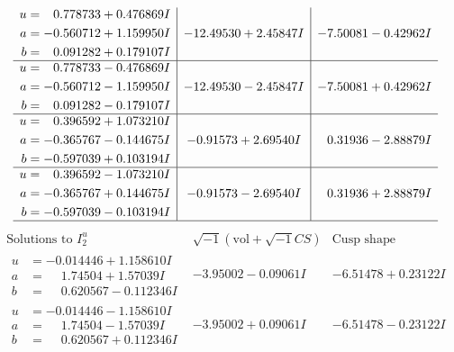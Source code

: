 \documentclass[1p]{elsarticle_modified}
\theoremstyle{definition}
\newcommand{\I}{\sqrt{-1}}
\begin{document}
$$\begin{array}{c|c|c}
\begin{aligned}
u &= \phantom{-}0.778733 + 0.476869 I \\
a &= -0.560712 + 1.159950 I \\
b &= \phantom{-}0.091282 + 0.179107 I\end{aligned}
 & -12.49530 + 2.45847 I & -7.50081 - 0.42962 I \\ \hline\begin{aligned}
u &= \phantom{-}0.778733 - 0.476869 I \\
a &= -0.560712 - 1.159950 I \\
b &= \phantom{-}0.091282 - 0.179107 I\end{aligned}
 & -12.49530 - 2.45847 I & -7.50081 + 0.42962 I \\ \hline\begin{aligned}
u &= \phantom{-}0.396592 + 1.073210 I \\
a &= -0.365767 - 0.144675 I \\
b &= -0.597039 + 0.103194 I\end{aligned}
 & -0.91573 + 2.69540 I & \phantom{-}0.31936 - 2.88879 I \\ \hline\begin{aligned}
u &= \phantom{-}0.396592 - 1.073210 I \\
a &= -0.365767 + 0.144675 I \\
b &= -0.597039 - 0.103194 I\end{aligned}
 & -0.91573 - 2.69540 I & \phantom{-}0.31936 + 2.88879 I\\
 \hline 
 \end{array}$$\newpage$$\begin{array}{c|c|c}  
\text{Solutions to }I^u_{2}& \I (\text{vol} + \sqrt{-1}CS) & \text{Cusp shape}\\
 \hline 
\begin{aligned}
u &= -0.014446 + 1.158610 I \\
a &= \phantom{-}1.74504 + 1.57039 I \\
b &= \phantom{-}0.620567 - 0.112346 I\end{aligned}
 & -3.95002 - 0.09061 I & -6.51478 + 0.23122 I \\ \hline\begin{aligned}
u &= -0.014446 - 1.158610 I \\
a &= \phantom{-}1.74504 - 1.57039 I \\
b &= \phantom{-}0.620567 + 0.112346 I\end{aligned}
 & -3.95002 + 0.09061 I & -6.51478 - 0.23122 I \\ \hline\begin{aligned}

\end{aligned}
\end{array}$$
\end{document}
